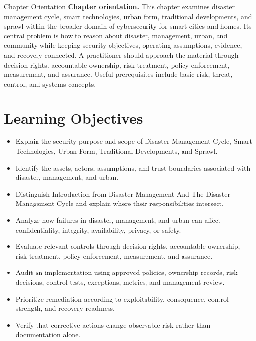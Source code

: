 \documentclass[11pt,letterpaper]{article}
\title{\CornellDocumentTitle}
\author{}
\date{}
\begin{document}
\maketitle
\begin{CornellOverviewBox}{Chapter Orientation}
\textbf{Chapter orientation.} This chapter examines disaster management cycle, smart technologies, urban form, traditional developments, and sprawl within the broader domain of cybersecurity for smart cities and homes. Its central problem is how to reason about disaster, management, urban, and community while keeping security objectives, operating assumptions, evidence, and recovery connected. A practitioner should approach the material through decision rights, accountable ownership, risk treatment, policy enforcement, measurement, and assurance. Useful prerequisites include basic risk, threat, control, and systems concepts.
\end{CornellOverviewBox}
\section*{Learning Objectives}
\begin{itemize}
\item Explain the security purpose and scope of Disaster Management Cycle, Smart Technologies, Urban Form, Traditional Developments, and Sprawl.
\item Identify the assets, actors, assumptions, and trust boundaries associated with disaster, management, and urban.
\item Distinguish Introduction from Disaster Management And The Disaster Management Cycle and explain where their responsibilities intersect.
\item Analyze how failures in disaster, management, and urban can affect confidentiality, integrity, availability, privacy, or safety.
\item Evaluate relevant controls through decision rights, accountable ownership, risk treatment, policy enforcement, measurement, and assurance.
\item Audit an implementation using approved policies, ownership records, risk decisions, control tests, exceptions, metrics, and management review.
\item Prioritize remediation according to exploitability, consequence, control strength, and recovery readiness.
\item Verify that corrective actions change observable risk rather than documentation alone.
\end{itemize}
\end{document}

